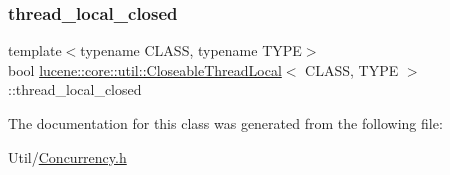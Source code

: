 \mbox{\label{classlucene_1_1core_1_1util_1_1CloseableThreadLocal_acd06e65a0e393a9dd64685a424868e35}} 
\subsubsection{\texorpdfstring{thread\+\_\+local\+\_\+closed}{thread\_local\_closed}}
{\footnotesize\ttfamily template$<$typename C\+L\+A\+SS, typename T\+Y\+PE$>$ \\
bool \mbox{\hyperlink{classlucene_1_1core_1_1util_1_1CloseableThreadLocal}{lucene\+::core\+::util\+::\+Closeable\+Thread\+Local}}$<$ C\+L\+A\+SS, T\+Y\+PE $>$\+::thread\+\_\+local\+\_\+closed\hspace{0.3cm}{\ttfamily [private]}}



The documentation for this class was generated from the following file\+:\begin{DoxyCompactItemize}
\item 
Util/\mbox{\hyperlink{Concurrency_8h}{Concurrency.\+h}}\end{DoxyCompactItemize}
